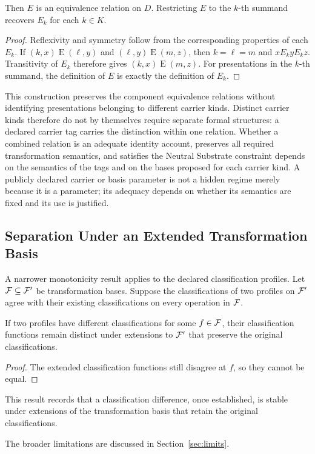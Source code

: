 \begin{proposition}
\label{se200.prop.CarrierIndexedCombination}
Then $E$ is an equivalence relation on $D$.
Restricting $E$ to the $k$-th summand recovers $E_k$
for each $k\in K$.
\end{proposition}

\begin{proof}
Reflexivity and symmetry follow from the corresponding properties
of each $E_k$.
If $(k,x)\mathrel{E}(\ell,y)$ and
$(\ell,y)\mathrel{E}(m,z)$, then $k=\ell=m$ and
$x\mathrel{E_k}y\mathrel{E_k}z$.
Transitivity of $E_k$ therefore gives $(k,x)\mathrel{E}(m,z)$.
For presentations in the $k$-th summand, the definition of $E$
is exactly the definition of $E_k$.
\end{proof}

This construction preserves the component equivalence relations
without identifying presentations belonging to different carrier kinds.
Distinct carrier kinds therefore do not by themselves require
separate formal structures: a declared carrier tag carries the
distinction within one relation.
Whether a combined relation is an adequate identity account, preserves
all required transformation semantics, and satisfies the Neutral
Substrate constraint depends on the semantics of the tags and on the
bases proposed for each carrier kind.
A publicly declared carrier or basis parameter is not a hidden regime
merely because it is a parameter; its adequacy depends on whether its
semantics are fixed and its use is justified.

\subsection{Separation Under an Extended Transformation Basis}
\label{subsec:monotonicity}

A narrower monotonicity result applies to the declared
classification profiles.
Let $\mathcal{F}\subseteq\mathcal{F}'$ be transformation bases.
Suppose the classifications of two profiles on $\mathcal{F}'$ agree
with their existing classifications on every operation in $\mathcal{F}$.

\begin{proposition}
\label{se200.prop.ClassificationDistinctionPersists}
If two profiles have different classifications for some
$f\in\mathcal{F}$, their classification functions remain distinct
under extensions to $\mathcal{F}'$ that preserve the original classifications.
\end{proposition}

\begin{proof}
The extended classification functions still disagree at $f$,
so they cannot be equal.
\end{proof}

This result records that a classification difference, once established,
is stable under extensions of the transformation basis that retain the
original classifications.

The broader limitations are discussed in Section~\ref{sec:limits}.
